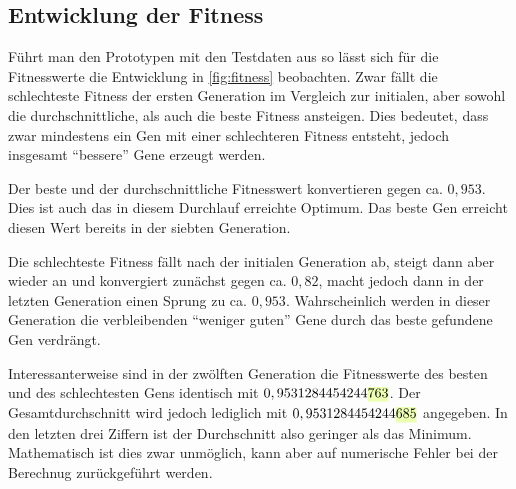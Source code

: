 
\subsection{Entwicklung der Fitness}

Führt man den Prototypen mit den Testdaten aus so lässt sich für die Fitnesswerte die Entwicklung in \autoref{fig:fitness} beobachten.
Zwar fällt die schlechteste Fitness der ersten Generation im Vergleich zur initialen,
aber sowohl die durchschnittliche, als auch die beste Fitness ansteigen.
Dies bedeutet, dass zwar mindestens ein Gen mit einer schlechteren Fitness entsteht,
jedoch insgesamt \enquote{bessere} Gene erzeugt werden.

Der beste und der durchschnittliche Fitnesswert konvertieren gegen ca. $0,953$.
Dies ist auch das in diesem Durchlauf erreichte Optimum.
Das beste Gen erreicht diesen Wert bereits in der siebten Generation.

Die schlechteste Fitness fällt nach der initialen Generation ab,
steigt dann aber wieder an und konvergiert zunächst gegen ca. $0,82$,
macht jedoch dann in der letzten Generation einen Sprung zu ca. $0,953$.
Wahrscheinlich werden in dieser Generation die verbleibenden \enquote{weniger guten} Gene durch das beste gefundene Gen verdrängt.

Interessanterweise sind in der zwölften Generation
die Fitnesswerte des besten und des schlechtesten Gens identisch mit $0,9531284454244\highlight{lime!30}{763}$.
Der Gesamtdurchschnitt wird jedoch lediglich mit $0,9531284454244\highlight{lime!30}{685}$ angegeben.
In den letzten drei Ziffern ist der Durchschnitt also geringer als das Minimum.
Mathematisch ist dies zwar unmöglich, kann aber auf numerische Fehler bei der Berechnug zurückgeführt werden.

